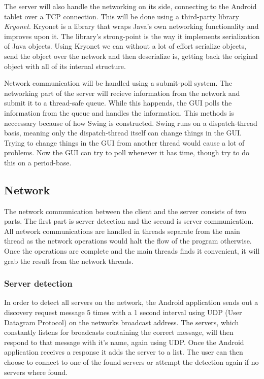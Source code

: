 \documentclass[12pt,a4paper,notitlepage]{report}
\begin{document}
The server will also handle the networking on its side, connecting to the Android tablet over a TCP connection. This will be done using a third-party library \textit{Kryonet}. \cite{kryonet} Kryonet is a library that wraps Java's own networking functionality and improves upon it. The library's strong-point is the way it implements serialization of Java objects. Using Kryonet we can without a lot of effort serialize objects, send the object over the network and then deserialize is, getting back the original object with all of its internal structure. 

Network communication will be handled using a submit-poll system. The networking part of the server will recieve information from the network and submit it to a thread-safe queue. While this happends, the GUI polls the information from the queue and handles the information. This methods is neccessary because of how Swing is constructed. Swing runs on a dispatch-thread basis, meaning only the dispatch-thread itself can change things in the GUI. Trying to change things in the GUI from another thread would cause a lot of problems. Now the GUI can try to poll whenever it has time, though try to do this on a period-base.  

\subsection{Network}
The network communication between the client and the server consists of two parts. The first part is server detection and the second is server communication. All network communications are handled in threads separate from the main thread as the network operations would halt the flow of the program otherwise. Once the operations are complete and the main threads finds it convenient, it will grab the result from the network threads.

\subsubsection{Server detection}
In order to detect all servers on the network, the Android application sends out a discovery request message 5 times with a 1 second interval using UDP (User Datagram Protocol) on the networks broadcast address. The servers, which constantly listens for broadcasts containing the correct message, will then respond to that message with it's name, again using UDP. Once the Android application receives a response it adds the server to a list. The user can then choose to connect to one of the found servers or attempt the detection again if no servers where found.
\end{document}
